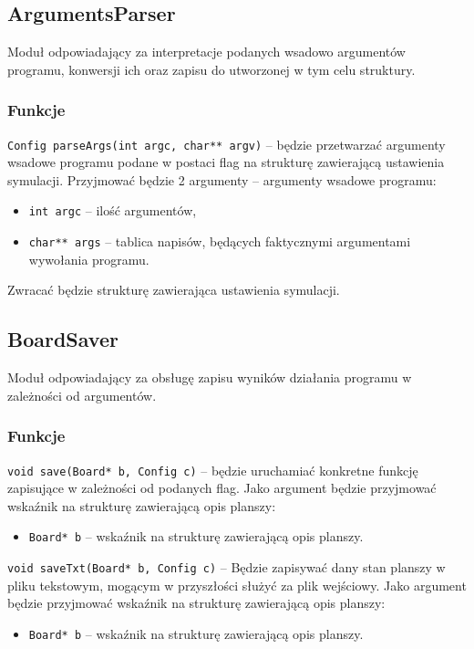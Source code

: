 \documentclass{article}
\begin{document}
\subsection{ArgumentsParser}
Moduł odpowiadający za interpretacje podanych wsadowo argumentów programu, konwersji ich oraz zapisu do utworzonej w tym celu struktury.

\subsubsection{Funkcje}
\texttt{Config parseArgs(int argc, char** argv)} -- będzie przetwarzać argumenty wsadowe programu podane w postaci flag na strukturę zawierającą ustawienia symulacji. Przyjmować będzie 2 argumenty -- argumenty wsadowe programu:
\begin{itemize}[label={}]
	\item \texttt{int argc} -- ilość argumentów,
	\item \texttt{char** args} -- tablica napisów, będących faktycznymi argumentami wywołania programu.
\end{itemize}

Zwracać będzie strukturę zawierająca ustawienia symulacji.

\subsection{BoardSaver}
Moduł odpowiadający za obsługę zapisu wyników działania programu w zależności od argumentów.

\subsubsection{Funkcje}
\texttt{void save(Board* b, Config c)} -- będzie uruchamiać konkretne funkcję zapisujące w zależności od podanych flag. Jako argument będzie przyjmować wskaźnik na strukturę zawierającą opis planszy:
\begin{itemize}[label={}]
	\item \texttt{Board* b} -- wskaźnik na strukturę zawierającą opis planszy.
\end{itemize}

\noindent{}\texttt{void saveTxt(Board* b, Config c)} -- Będzie zapisywać dany stan planszy w pliku tekstowym, mogącym w przyszłości służyć za plik wejściowy. Jako argument będzie przyjmować wskaźnik na strukturę zawierającą opis planszy:
\begin{itemize}
	\item \texttt{Board* b} -- wskaźnik na strukturę zawierającą opis planszy.
\end{itemize}
\end{document}
